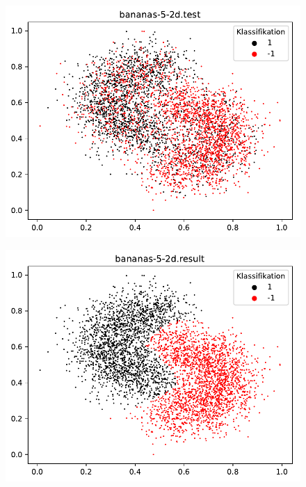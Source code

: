 \documentclass{beamer}
\begin{document}
\begin{figure}[h]
\centering
\includegraphics[scale=0.7]{bananas-5-2d-test.pdf}
\label{bananas}
\end{figure}

\begin{figure}[h]
\centering
\includegraphics[scale=0.7]{bananas-5-2d-result.pdf}
\label{bananas}
\end{figure}

\end{document}
